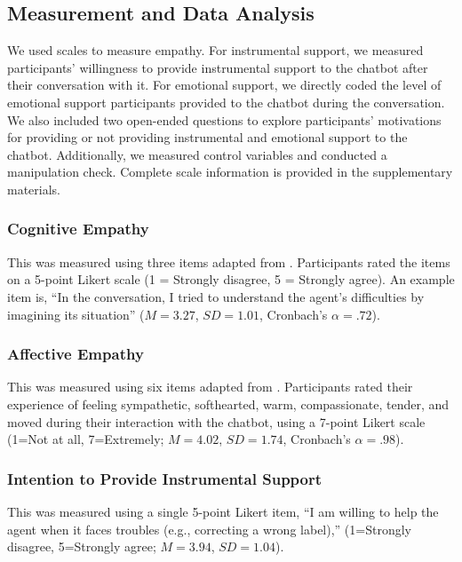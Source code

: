 \subsection{Measurement and Data Analysis}
We used scales to measure empathy. For instrumental support, we measured participants’ willingness to provide instrumental support to the chatbot after their conversation with it. For emotional support, we directly coded the level of emotional support participants provided to the chatbot during the conversation. We also included two open-ended questions to explore participants’ motivations for providing or not providing instrumental and emotional support to the chatbot. Additionally, we measured control variables and conducted a manipulation check. Complete scale information is provided in the supplementary materials.

\subsubsection{Cognitive Empathy}
This was measured using three items adapted from \cite{davis1983measuring}. Participants rated the items on a 5-point Likert scale (1 = Strongly disagree, 5 = Strongly agree). An example item is, “In the conversation, I tried to understand the agent’s difficulties by imagining its situation” ($M = 3.27$, $SD = 1.01$, Cronbach's \(\alpha =.72\)).


\subsubsection{Affective Empathy}
This was measured using six items adapted from \cite{Baston1997perspective,Herrera2018Building}. Participants rated their experience of feeling sympathetic, softhearted, warm, compassionate, tender, and moved during their interaction with the chatbot, using a 7-point Likert scale (1=Not at all, 7=Extremely; $M=4.02$, $SD=1.74$, Cronbach's \(\alpha=.98\)).


\subsubsection{Intention to Provide Instrumental Support}
This was measured using a single 5-point Likert item, ``I am willing to help the agent when it faces troubles (e.g., correcting a wrong label),'' (1=Strongly disagree, 5=Strongly agree; $M=3.94$, $SD=1.04$).



